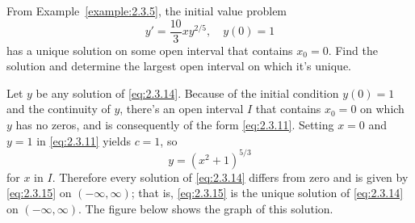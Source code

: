\documentclass{ximera}
\begin{document}
\begin{example}
\begin{explanation}
\end{explanation}
\end{example}

\begin{example}\label{example:2.3.8}
From Example~\ref{example:2.3.5}, the initial value
problem
\begin{equation} \label{eq:2.3.14}
y'=\frac{10}{3}xy^{2/5}, \quad y(0)=1
\end{equation}
 has a unique solution on some open interval that contains $x_0=0$.
Find the solution and determine the largest open interval on which it's
unique.
\begin{explanation}
Let $y$ be any solution of \eqref{eq:2.3.14}. Because of the initial
condition $y(0)=1$ and the continuity of $y$, there's an open interval
$I$ that contains $x_0=0$ on which $y$ has no zeros, and is consequently
of the form \eqref{eq:2.3.11}. Setting $x=0$ and $y=1$ in \eqref{eq:2.3.11}
yields $c=1$, so
\begin{equation} \label{eq:2.3.15}
y=(x^2+1)^{5/3}
\end{equation}
for $x$ in $I$. Therefore every solution of \eqref{eq:2.3.14}
differs from zero and is given by \eqref{eq:2.3.15} on $(-\infty,\infty)$;
that is, \eqref{eq:2.3.15} is the unique solution of \eqref{eq:2.3.14} on
$(-\infty,\infty)$.
The figure below shows the graph of this solution.

\begin{center}
\end{center}

\end{explanation}
\end{example}
\end{document}
